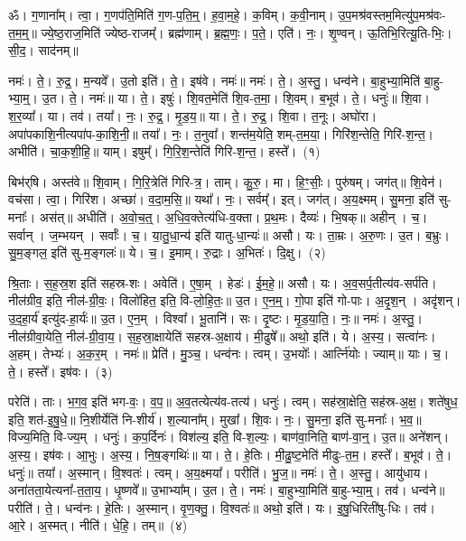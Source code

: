 \newcommand{\akhkhi}{\char"0916\char"094D\char"0916\char"093F\char"E009\hspace{-2ex} \char"E009\hspace{1.2ex}}

ॐ। ग॒णाना᳚म्। त्वा॒। ग॒णप॑ति॒मिति॑ ग॒ण-प॒ति॒म्॒। ह॒वा॒म॒हे॒। क॒विम्। क॒वी॒नाम्। उ॒प॒मश्र॑वस्तम॒मित्यु॑प॒मश्र॑वः-त॒म॒म्॒॥ 
ज्ये॒ष्ठ॒राज॒मिति॑ ज्येष्ठ-राजम्᳚। ब्रह्म॑णाम्। ब्र॒ह्म॒णः॒। प॒ते॒। एति॑। नः॒। शृ॒ण्वन्। ऊ॒तिभि॒रित्यू॒ति-भिः॒। सी॒द॒। साद॑नम्॥ 


नमः॑। ते॒। रु॒द्र॒। म॒न्यवे᳚। उ॒तो इति॑। ते॒। इष॑वे। नमः॑॥ 
नमः॑। ते॒। अ॒स्तु॒। धन्व॑ने। बा॒हुभ्या॒मिति॑ बा॒हु-भ्या॒म्॒। उ॒त। ते॒। नमः॑॥ 
या। ते॒। इषुः॑। शि॒वत॒मेति॑ शि॒व-त॒मा॒। शि॒वम्। ब॒भूव॑। ते॒। धनुः॑॥ 
शि॒वा। श॒र॒व्या᳚। या। तव॑। तया᳚। नः॒। रु॒द्र॒। मृ॒ड॒य॒॥ 
या। ते॒। रु॒द्र॒। शि॒वा। त॒नूः। अघो॑रा। अपा॑पकाशि॒नीत्यपा॑प-का॒शि॒नी॒॥ 
तया᳚। नः॒। त॒नुवा᳚। शन्त॑म॒येति॒ शम्-त॒म॒या॒। गिरि॑श॒न्तेति॒ गिरि॑-श॒न्त॒। अभीति॑। चा॒क॒शी॒हि॒॥ 
याम्। इषुम्᳚। गि॒रि॒श॒न्तेति॑ गिरि-श॒न्त॒। हस्ते᳚।~(१)


बिभ॑र्‌षि। अस्त॑वे॥ 
शि॒वाम्। गि॒रि॒त्रेति॑ गिरि-त्र॒। ताम्। कु॒रु॒। मा। हि॒ꣳ॒सीः॒। पुरु॑षम्। जग॑त्॥ 
शि॒वेन॑। वच॑सा। त्वा॒। गिरि॑श। अच्छा॑। व॒दा॒म॒सि॒॥ 
यथा᳚। नः॒। सर्वम्᳚। इत्। जग॑त्। अ॒य॒क्ष्मम्। सु॒मना॒ इति॑ सु-मनाः᳚। अस॑त्॥ 
अधीति॑। अ॒वो॒च॒त्॒। अ॒धि॒व॒क्तेत्य॑धि-व॒क्ता। प्र॒थ॒मः। दैव्यः॑। भि॒षक्॥ 
अहीन्। च॒। सर्वान्। ज॒म्भयन्। सर्वाः᳚। च॒। या॒तु॒धा॒न्य॑ इति॑ यातु-धा॒न्यः॑॥ 
असौ। यः। ता॒म्रः। अ॒रु॒णः। उ॒त। ब॒भ्रुः। सु॒म॒ङ्गल॒ इति॑ सु-म॒ङ्गलः॑॥ 
ये। च॒। इ॒माम्। रु॒द्राः। अ॒भितः॑। दि॒क्षु।~(२)


श्रि॒ताः। स॒ह॒स्र॒श इति॑ सहस्र-शः। अवेति॑। ए॒षा॒म्। हेडः॑। ई॒म॒हे॒॥ 
असौ। यः। अ॒व॒सर्प॒तीत्य॑व-सर्प॑ति। नील॑ग्रीव॒ इति॒ नील॑-ग्री॒वः॒। विलो॑हित॒ इति॒ वि-लो॒हि॒तः॒॥ 
उ॒त। ए॒न॒म्॒। गो॒पा इति॑ गो-पाः। अ॒दृ॒श॒न्। अदृ॑शन्। उ॒द॒हा॒र्य॑ इत्यु॑द-हा॒र्यः॑॥ 
उ॒त। ए॒न॒म्। विश्वा᳚। भू॒तानि॑। सः। दृ॒ष्टः। मृ॒ड॒या॒ति॒। नः॒॥ 
नमः॑। अ॒स्तु॒। नील॑ग्रीवा॒येति॒ नील॑-ग्री॒वा॒य॒। स॒ह॒स्रा॒क्षायेति॑ सहस्र-अ॒क्षाय॑। मी॒ढुषे᳚॥
अथो॒ इति॑। ये। अ॒स्य॒। सत्वा॑नः। अ॒हम्। तेभ्यः॑। अ॒क॒र॒म्। नमः॑॥ 
प्रेति॑। मु॒ञ्च॒। धन्व॑नः। त्वम्। उ॒भयोः᳚। आर्त्नि॑योः। ज्याम्॥ 
याः। च॒। ते॒। हस्ते᳚। इष॑वः।~(३)


परेति॑। ताः। भ॒ग॒व॒ इति॑ भग-वः॒। व॒प॒॥ 
अ॒व॒तत्येत्य॑व-तत्य॑। धनुः॑। त्वम्। सह॑स्रा॒क्षेति॒ सह॑स्र-अ॒क्ष॒। शते॑षुध॒ इति॒ शत॑-इ॒षु॒धे॒॥ 
नि॒शीर्येति॑ नि-शीर्य॑। श॒ल्याना᳚म्। मुखा᳚। शि॒वः। नः॒। सु॒मना॒ इति॑ सु-मनाः᳚। भ॒व॒॥ 
विज्य॒मिति॒ वि-ज्य॒म्। धनुः॑। क॒प॒र्दिनः॑। विश॑ल्य॒ इति॒ वि-श॒ल्यः॒। बाण॑वा॒निति॒ बाण॑-वा॒न्॒। उ॒त॥ 
अने॑शन्। अ॒स्य॒। इष॑वः। आ॒भुः। अ॒स्य॒। नि॒ष॒ङ्गथिः॑॥ 
या। ते॒। हे॒तिः। मी॒ढु॒ष्ट॒मेति॑ मीढुः-त॒म॒। हस्ते᳚। ब॒भूव॑। ते॒। धनुः॑॥ 
तया᳚। अ॒स्मान्। वि॒श्वतः॑। त्वम्। अ॒य॒क्ष्मया᳚। परीति॑। भु॒ज॒॥ 
नमः॑। ते॒। अ॒स्तु॒। आयु॑धाय। अना॑तता॒येत्यना᳚-त॒ता॒य॒। धृ॒ष्णवे᳚॥ 
उ॒भाभ्या᳚म्। उ॒त। ते॒। नमः॑। बा॒हुभ्या॒मिति॑ बा॒हु-भ्या॒म्॒। तव॑। धन्व॑ने॥ 
परीति॑। ते॒। धन्व॑नः। हे॒तिः। अ॒स्मान्। वृ॒ण॒क्तु॒। वि॒श्वतः॑॥
 अथो॒ इति॑। यः। इ॒षु॒धिरिती॑षु-धिः। तव॑। आ॒रे। अ॒स्मत्। नीति॑। धे॒हि॒। तम्॥~(४)


